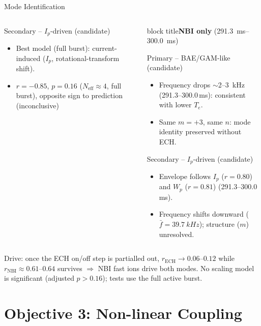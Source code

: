 \documentclass[aspectratio=169,xcolor=table]{beamer}
\newlength{\qboxwidth}
\newlength{\qboxbodyH}
\newcommand{\qbox}[3][\qboxbodyH]{%
  \begin{block}{#2}%
    \begin{minipage}[t][#1][t]{\linewidth}%
      \footnotesize
      \begin{itemize}#3\end{itemize}%
    \end{minipage}%
  \end{block}%
}
\newcommand{\winB}{\textbf{NBI only} {\scriptsize(\SIrange{291.3}{300.0}{ms})}}
\newcommand{\colhead}[1]{%
    \begin{beamercolorbox}[wd=\linewidth,sep=0.6ex,center]{block title}#1\end{beamercolorbox}}
\newcommand{\incl}{{\scriptsize\textcolor{red!70!black}{(inconclusive)}}}
\begin{document}
\begin{frame}{Mode Identification}
\begin{columns}[onlytextwidth,T]
\begin{column}{\qboxwidth}
            \qbox{Secondary -- $I_p$-driven (candidate)}{%
                \item Best model (full burst): current-induced ($I_p$, rotational-transform shift).%
                \item $r=-0.85$, $p=0.16$ ($N_{\text{eff}}\approx4$, full burst), opposite sign to prediction \incl%
            }
        \end{column}%
        \hfill
        \begin{column}{\qboxwidth}
            \colhead{\winB}
            \vspace{0.04cm}
            \qbox{Primary -- BAE/GAM-like (candidate)}{%
                \item Frequency drops ${\sim}$2--\SI{3}{kHz} (291.3--300.0\,ms): consistent with lower $T_e$.%
                \item Same $m=+3$, same $n$: mode identity preserved without ECH.%
            }
            \vspace{0.08cm}
            \qbox{Secondary -- $I_p$-driven (candidate)}{%
                \item Envelope follows $I_p$ ($r=0.80$) and $W_p$ ($r=0.81$) (291.3--300.0\,ms).%
                \item Frequency shifts downward ($\bar{f}=\SI{39.7}{kHz}$); structure ($m$) unresolved.%
            }
        \end{column}
    \end{columns}
    \vspace{0.04cm}
    {\scriptsize Drive: once the ECH on/off step is partialled out, $r_{\text{ECH}}\to0.06$--$0.12$
    while $r_{\text{NBI}}\approx0.61$--$0.64$ survives $\Rightarrow$ NBI fast ions drive both modes.
    No scaling model is significant (adjusted $p>0.16$); tests use the full active burst.\par}
\end{frame}

\section{Objective 3: Non-linear Coupling}
\end{document}
